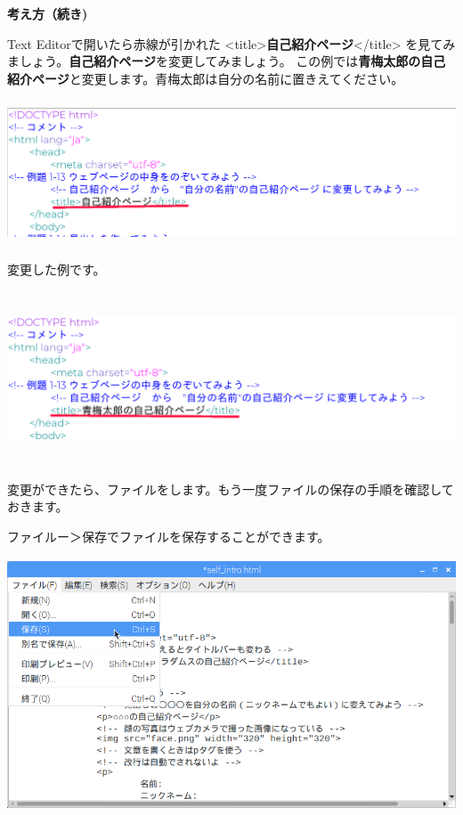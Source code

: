 \documentclass[a4paper,12pt]{jarticle}
\begin{document}
\clearpage
\textbf{考え方（続き)}

Text Editorで開いたら赤線が引かれた
{\textless}title{\textgreater}\textbf{自己紹介ページ}{\textless}/title{\textgreater}
を見てみましょう。\textbf{自己紹介ページ}を変更してみましょう。
この例では\textbf{青梅太郎の自己紹介ページ}と変更します。青梅太郎は自分の名前に置きえてください。


\centering
\includegraphics[width=16.316cm,height=4.29cm]{textbook-img146.png}



\bigskip

\flushleft
変更した例です。

\centering
\includegraphics[width=16.198cm,height=5.145cm]{textbook-img148.png}


\bigskip

\flushleft
変更ができたら、ファイルをします。もう一度ファイルの保存の手順を確認しておきます。

ファイルー＞保存でファイルを保存することができます。



\centering
\includegraphics[width=13.624cm,height=7.512cm]{textbook-img147.png}
\end{document}
